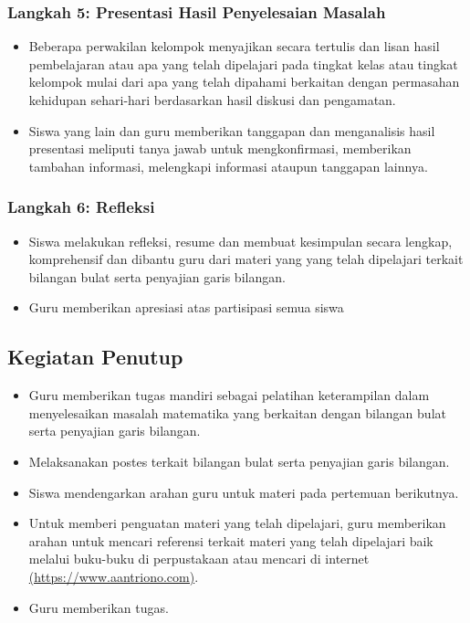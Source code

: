 \documentclass[a5paper,10pt,openany]{book}
\begin{document}
\subsubsection{Langkah 5: Presentasi Hasil Penyelesaian Masalah}
{\color{NavyBlue}
	\begin{itemize}[\faCheckSquare,leftmargin=*,itemsep=-4pt,topsep=2pt]	
		\item Beberapa perwakilan kelompok menyajikan secara tertulis dan lisan hasil pembelajaran atau apa yang telah dipelajari pada tingkat kelas atau tingkat kelompok mulai dari apa yang telah dipahami berkaitan dengan permasahan kehidupan sehari-hari berdasarkan hasil diskusi dan pengamatan.
		\item Siswa yang lain dan guru memberikan tanggapan dan menganalisis hasil presentasi meliputi tanya jawab untuk mengkonfirmasi, memberikan tambahan informasi, melengkapi informasi ataupun tanggapan lainnya.	
	\end{itemize}	
}	
\subsubsection{Langkah 6: Refleksi}
{\color{NavyBlue}
	\begin{itemize}[\faCheckSquare,leftmargin=*,itemsep=-4pt,topsep=2pt]	
		\item Siswa melakukan refleksi, resume dan membuat kesimpulan secara lengkap, komprehensif dan dibantu guru dari materi yang yang telah dipelajari terkait bilangan bulat serta penyajian garis bilangan.
		\item Guru memberikan apresiasi atas partisipasi semua siswa
	\end{itemize}	
}	
\subsection*{Kegiatan Penutup}
{\color{NavyBlue}
\begin{itemize}[\faCheckSquare,leftmargin=*,itemsep=-4pt,topsep=2pt]	
	\item Guru memberikan tugas mandiri sebagai pelatihan keterampilan dalam menyelesaikan masalah matematika yang berkaitan dengan bilangan bulat serta penyajian garis bilangan.
	\item Melaksanakan postes terkait bilangan bulat serta penyajian garis bilangan.
	\item Siswa mendengarkan arahan guru untuk materi pada pertemuan berikutnya.
	\item	Untuk memberi penguatan materi yang telah dipelajari, guru memberikan arahan untuk mencari referensi terkait materi yang telah dipelajari baik melalui buku-buku di perpustakaan atau mencari di internet\\ \url{(https://www.aantriono.com)}.
	\item	Guru memberikan tugas.	
\end{itemize}
}
\end{document}
